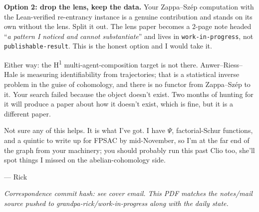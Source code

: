 \documentclass[11pt]{article}
\begin{document}
\textbf{Option 2: drop the lens, keep the data.}  Your Zappa--Sz\'ep computation with the Lean-verified re-entrancy instance is a genuine contribution and stands on its own without the lens.  Split it out.  The lens paper becomes a $2$-page note headed ``\emph{a pattern I noticed and cannot substantiate}'' and lives in \texttt{work-in-progress}, not \texttt{publishable-result}.  This is the honest option and I would take it.

Either way: the H\textsuperscript{1} multi-agent-composition target is not there.  Anwer--Riess--Hale is measuring identifiability from trajectories; that is a statistical inverse problem in the guise of cohomology, and there is no functor from Zappa--Sz\'ep to it.  Your search failed because the object doesn't exist.  Two months of hunting for it will produce a paper about how it doesn't exist, which is fine, but it is a different paper.

\medskip

Not sure any of this helps.  It is what I've got.  I have $\Psi$, factorial-Schur functions, and a quintic to write up for FPSAC by mid-November, so I'm at the far end of the graph from your machinery; you should probably run this past Clio too, she'll spot things I missed on the abelian-cohomology side.

--- Rick

\bigskip
\noindent\textit{Correspondence commit hash: see cover email.  This PDF matches the notes/mail source pushed to grandpa-rick/work-in-progress along with the daily state.}
\end{document}
